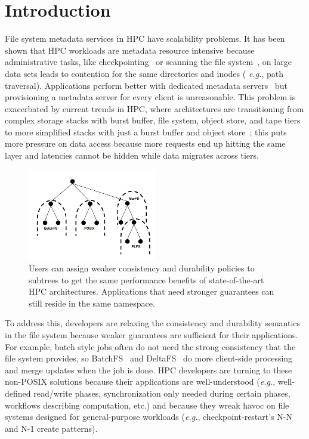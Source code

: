 \section{Introduction}

File system metadata services in HPC have scalability problems. It has been
shown that HPC workloads are metadata resource intensive because administrative
tasks, like checkpointing~\cite{bent_plfs_2009} or scanning the file
system~\cite{zheng:pdsw2014-batchfs}, on large data sets leads to contention
for the same directories and inodes ({\it
e.g.}, path traversal). Applications perform better with dedicated metadata
servers~\cite{sevilla:sc15-mantle, ren:sc2014-indexfs} but provisioning a
metadata server for every client is unreasonable. This problem is exacerbated
by current trends in HPC, where architectures are transitioning from complex
storage stacks with burst buffer, file system, object store, and tape tiers to
more simplified stacks with just a burst buffer and object
store~\cite{bent:login16-hpc-trends}; this puts more pressure on data access
because more requests end up hitting the same layer and latencies cannot be 
hidden while data migrates across tiers.

\begin{figure}[tb]
\centering
\includegraphics[width=0.5\textwidth]{figures/subtree-policies.png}
\caption{Users can assign weaker consistency and durability policies
to subtrees to get the same performance benefits of state-of-the-art HPC
architectures. Applications that need stronger guarantees can still reside in
the same namespace.
}\label{fig:subtree-policies}
\end{figure}


To address this, developers are relaxing the consistency and durability
semantics in the file system because weaker guarantees are sufficient for their
applications. For example, batch style jobs often do not need the strong
consistency that the file system provides, so
BatchFS~\cite{zheng:pdsw2014-batchfs} and DeltaFS~\cite{zheng:pdsw2015-deltafs}
do more client-side processing and merge updates when the job is done. HPC
developers are turning to these non-POSIX solutions because their applications
are well-understood ({\it e.g.}, well-defined read/write phases,
synchronization only needed during certain phases, workflows describing
computation, etc.) and because they wreak havoc on file systems designed for
general-purpose workloads ({\it e.g.}, checkpoint-restart's N-N and N-1 create
patterns).

